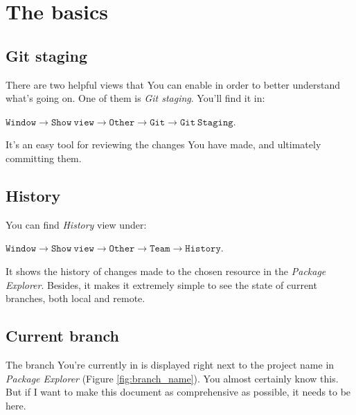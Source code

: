\documentclass{article}
\begin{document}
\section{The basics}

\subsection{Git staging}
\label{sec:git_staging}

There are two helpful views that You can enable in order to better understand what's going on. One of them is \textit{Git staging}. You'll find it in: \newline

$\mathtt{Window\rightarrow Show\ view \rightarrow Other \rightarrow Git \rightarrow Git\ Staging}$.\newline

It's an easy tool for reviewing the changes You have made, and ultimately committing them.

\subsection{History}
\label{sec:git_history}

You can find \textit{History} view under: \newline

$\mathtt{Window \rightarrow Show\ view \rightarrow Other \rightarrow Team \rightarrow History}$.\newline

It shows the history of changes made to the chosen resource in the \textit{Package Explorer}. Besides, it makes it extremely simple to see the state of current branches, both local and remote.

\subsection{Current branch}

The branch You're currently in is displayed right next to the project name in \textit{Package Explorer} (Figure  \ref{fig:branch_name}). You almost certainly know this. But if I want to make this document as comprehensive as possible, it needs to be here.
\end{document}

